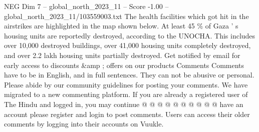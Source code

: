 \begin{textsample}{NEG Dim 7 – global\_north\_2023\_11 – Score -1.00 – global\_north\_2023\_11/103559003.txt}
The health facilities which got hit in the airstrikes are highlighted in the map shown below.
At least 45 \% of Gaza ' s housing units are reportedly destroyed, according to the UNOCHA.
This includes over 10,000 destroyed buildings, over 41,000 housing units completely destroyed, and over 2.2 lakh housing units partially destroyed.
Get notified by email for early access to discounts \&amp ; offers on our products Comments Comments have to be in English, and in full sentences.
They can not be abusive or personal.
Please abide by our community guidelines for posting your comments.
We have migrated to a new commenting platform.
If you are already a registered user of The Hindu and logged in, you may continue @ @ @ @ @ @ @ @ @ @ have an account please register and login to post comments.
Users can access their older comments by logging into their accounts on Vuukle.

\end{textsample}

